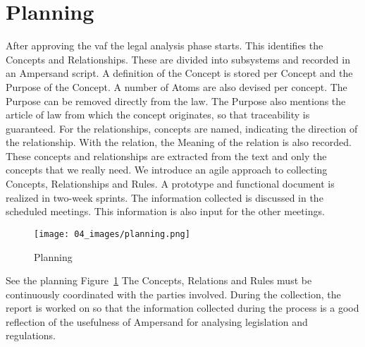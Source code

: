\section{Planning} \label{planning}
\begin{comment}
Researching is taking a plunge into the unknown. A detailed planning is, therefore, not possible.

Try to know, at least, what you will do during the first weeks, and show roughly how you imagine going on from then.

You might consider mentioning deliverables that you deliver at certain milestones.



Also, make a risk analysis. For instance, it may be very difficult, or impossible, to answer some of your questions. Are you prepared for setbacks, and how?

You should at least prioritize: which question do you want to be able to answer at least, for instance?
\end{comment}
After approving the \acrfull{vaf} the legal analysis phase starts.
This identifies the Concepts and Relationships.
These are divided into subsystems and recorded in an Ampersand script.
A definition of the Concept is stored per Concept and the Purpose of the Concept.
A number of Atoms are also devised per concept.
The Purpose can be removed directly from the law.
The Purpose also mentions the article of law from which the concept originates, so that traceability is guaranteed.
For the relationships, concepts are named, indicating the direction of the relationship.
With the relation, the Meaning of the relation is also recorded.
These concepts and relationships are extracted from the text and only the concepts that we really need.
We introduce an agile approach to collecting Concepts, Relationships and Rules. A prototype and functional document is realized in two-week sprints. The information collected is discussed in the scheduled meetings. This information is also input for the other meetings.

\begin{figure}[htp]
    \centering
    \texttt{[image: 04\_images/planning.png]}
    \caption{Planning}
    \label{fig:Planning}
\end{figure}
See the planning Figure~\ref{fig:Planning}
The Concepts, Relations and Rules must be continuously coordinated with the parties involved.
During the collection, the report is worked on so that the information collected during the process is a good reflection of the usefulness of Ampersand for analysing legislation and regulations.


